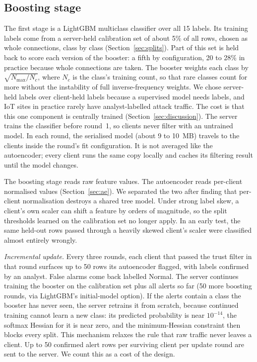 \subsection{Boosting stage}
\label{sec:booster}
The first stage is a LightGBM multiclass classifier over all 15 labels. Its training labels come from a server-held calibration set of about 5\% of all rows, chosen as whole connections, class by class (Section~\ref{sec:splits}). Part of this set is held back to score each version of the booster: a fifth by configuration, 20 to 28\% in practice because whole connections are taken. The booster weights each class by $\sqrt{N_{\max}/N_c}$, where $N_c$ is the class's training count, so that rare classes count for more without the instability of full inverse-frequency weights. We chose server-held labels over client-held labels because a supervised model needs labels, and IoT sites in practice rarely have analyst-labelled attack traffic. The cost is that this one component is centrally trained (Section~\ref{sec:discussion}). The server trains the classifier before round~1, so clients never filter with an untrained model. In each round, the serialised model (about 9 to 10~MB) travels to the clients inside the round's fit configuration. It is not averaged like the autoencoder; every client runs the same copy locally and caches its filtering result until the model changes.

The boosting stage reads raw feature values. The autoencoder reads per-client normalised values (Section~\ref{sec:ae}). We separated the two after finding that per-client normalisation destroys a shared tree model. Under strong label skew, a client's own scaler can shift a feature by orders of magnitude, so the split thresholds learned on the calibration set no longer apply. In an early test, the same held-out rows passed through a heavily skewed client's scaler were classified almost entirely wrongly.

\textit{Incremental update.} Every three rounds, each client that passed the trust filter in that round surfaces up to 50 rows its autoencoder flagged, with labels confirmed by an analyst. False alarms come back labelled Normal. The server continues training the booster on the calibration set plus all alerts so far (50 more boosting rounds, via LightGBM's initial-model option). If the alerts contain a class the booster has never seen, the server retrains it from scratch, because continued training cannot learn a new class: its predicted probability is near $10^{-14}$, the softmax Hessian for it is near zero, and the minimum-Hessian constraint then blocks every split. This mechanism relaxes the rule that raw traffic never leaves a client. Up to 50 confirmed alert rows per surviving client per update round are sent to the server. We count this as a cost of the design.


